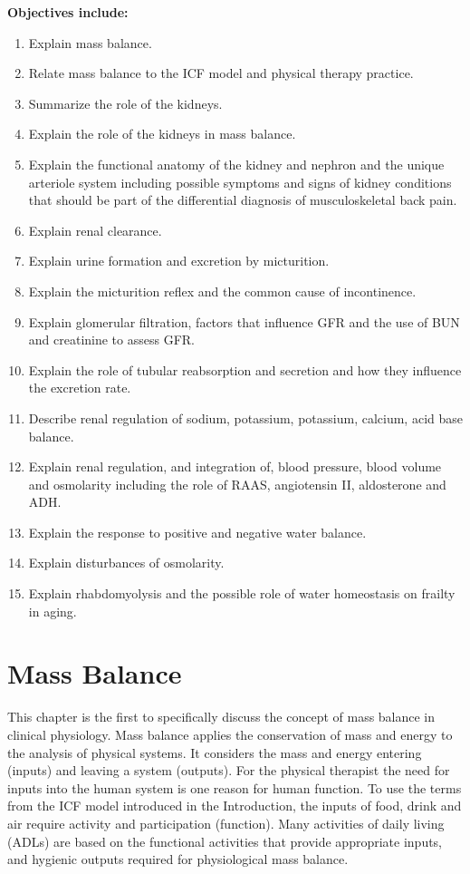\textbf{Objectives include:}
\begin{enumerate}
    \item Explain mass balance.
    \item Relate mass balance to the ICF model and physical therapy practice. 
    \item Summarize the role of the kidneys.
    \item Explain the role of the kidneys in mass balance.
    \item Explain the functional anatomy of the kidney and nephron and the unique arteriole system including possible symptoms and signs of kidney conditions that should be part of the differential diagnosis of musculoskeletal back pain.
    \item Explain renal clearance.
    \item Explain urine formation and excretion by micturition.
    \item Explain the micturition reflex and the common cause of incontinence.
    \item Explain glomerular filtration, factors that influence GFR and the use of BUN and creatinine to assess GFR.
    \item Explain the role of tubular reabsorption and secretion and how they influence the excretion rate.
    \item Describe renal regulation of sodium, potassium, potassium, calcium, acid base balance.
    \item Explain renal regulation, and integration of, blood pressure, blood volume and osmolarity including the role of RAAS, angiotensin II, aldosterone and ADH.
    \item Explain the response to positive and negative water balance.
    \item Explain disturbances of osmolarity.
    \item Explain rhabdomyolysis and the possible role of water homeostasis on frailty in aging.
\end{enumerate}

\section{Mass Balance}

This chapter is the first to specifically discuss the concept of mass balance in clinical physiology. Mass balance applies the conservation of mass and energy to the analysis of physical systems. It considers the mass and energy entering (inputs) and leaving a system (outputs). For the physical therapist the need for inputs into the human system is one reason for human function. To use the terms from the ICF model introduced in the Introduction, the inputs of food, drink and air require activity and participation (function). Many activities of daily living (ADLs) are based on the functional activities that provide appropriate inputs, and hygienic outputs required for physiological mass balance.

